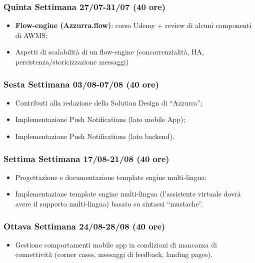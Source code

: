 {    \subsubsection{Quinta Settimana 27/07-31/07 (40 ore)}
    	 \begin{itemize}
    			\item \textbf{Flow-engine (Azzurra.flow)}: corso Udemy + review di alcuni componenti di AWMS;
    			\item Aspetti di scalabilità di un flow-engine (concorrenzialità, HA, persistenza/storicizzazione
    			messaggi)
    	\end{itemize}
    	
    \subsubsection{Sesta Settimana 03/08-07/08 (40 ore)}
     	 \begin{itemize}
     		\item Contributi alla redazione della Solution Design di “Azzurra”;
     		\item Implementazione Push Notifications (lato mobile App);
     		\item Implementazione Push Notifications (lato backend).
     	\end{itemize}
    
    \subsubsection{Settima Settimana 17/08-21/08 (40 ore)}
    	 \begin{itemize}
    		\item Progettazione e documentazione template engine multi-lingua;
    		\item Implementazione template engine multi-lingua (l’assistente virtuale dovrà avere il supporto multi-lingua) basato su sintassi “mustache”.
    	\end{itemize}	
    
    \subsubsection{Ottava Settimana 24/08-28/08 (40 ore)}
    	 \begin{itemize}
    		\item Gestione comportamenti mobile app in condizioni di mancanza di connettività (corner cases, messaggi di feedback, landing pages).
    	\end{itemize}
    
}
